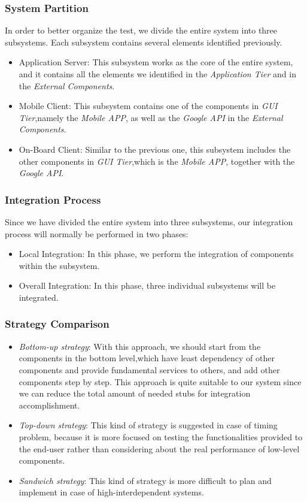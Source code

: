 \documentclass[a4paper,11pt]{article}
\begin{document}
	\subsubsection{System Partition}
	In order to better organize the test, we divide the entire system into three subsystems. Each subsystem contains several elements identified previously.
	\begin{itemize}
		\item Application Server: This subsystem works as the core of the entire system, and it contains all the elements we identified in the \textsl{Application Tier} and in the \textsl{External Components}.
		\item Mobile Client: This subsystem contains one of the components in \textsl{GUI Tier},namely the \textsl{Mobile APP}, as well as the \textsl{Google API} in the \textsl{External Components}.
		\item On-Board Client: Similar to the previous one, this subsystem includes the other components in \textsl{GUI Tier},which is the \textsl{Mobile APP}, together with the \textsl{Google API}.
	\end{itemize}
	\subsubsection{Integration Process}
	Since we have divided the entire system into three subsystems, our integration process will normally be performed in two phases:
	\begin{itemize}
		\item Local Integration: In this phase, we perform the integration of components within the subsystem.
		\item Overall Integration: In this phase, three individual subsystems will be integrated.
	\end{itemize}
	\subsubsection{Strategy Comparison}
	\begin{itemize}
		\item \textsl{Bottom-up strategy}: With this approach, we should start from the components in the bottom level,which have least dependency of other components and provide fundamental services to others, and add other components step by step. This approach is quite suitable to our system since we can reduce the total amount of needed stubs for integration accomplishment. 
		\item \textsl{Top-down strategy}: This kind of strategy is suggested in case of timing problem, because it is more focused on testing the functionalities provided to the end-user rather than considering about the real performance of low-level components.
		
		\item \textsl{Sandwich strategy}: This kind of strategy is more difficult to plan and implement in case of high-interdependent systems.
		
	\end{itemize}
	
\end{document}
